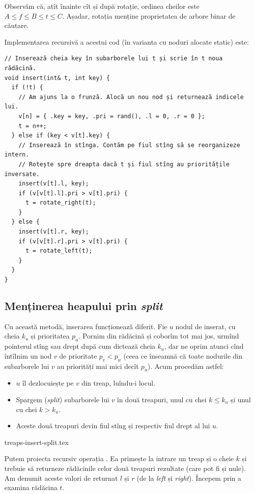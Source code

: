 \documentclass[../main.tex]{subfiles}
\begin{document}
Observăm că, atît înainte cît și după rotație, ordinea cheilor este $A \leq f \leq B \leq t \leq C$. Așadar, rotația menține proprietatea de arbore binar de căutare.

Implementarea recursivă a acestui cod (în varianta cu noduri alocate static) este:

\begin{verbatim}
// Inserează cheia key în subarborele lui t și scrie în t noua rădăcină.
void insert(int& t, int key) {
  if (!t) {
    // Am ajuns la o frunză. Alocă un nou nod și returnează indicele lui.
    v[n] = { .key = key, .pri = rand(), .l = 0, .r = 0 };
    t = n++;
  } else if (key < v[t].key) {
    // Inserează în stînga. Contăm pe fiul stîng să se reorganizeze intern.
    // Rotește spre dreapta dacă t și fiul stîng au prioritățile inversate.
    insert(v[t].l, key);
    if (v[v[t].l].pri > v[t].pri) {
      t = rotate_right(t);
    }
  } else {
    insert(v[t].r, key);
    if (v[v[t].r].pri > v[t].pri) {
      t = rotate_left(t);
    }
  }
}
\end{verbatim}


\subsection{Menținerea heapului prin \textit{split}}

Cu această metodă, inserarea funcționează diferit. Fie $u$ nodul de inserat, cu cheia $k_u$ și prioritatea $p_u$. Pornim din rădăcină și coborîm tot mai jos, urmînd pointerul stîng sau drept după cum dictează cheia $k_u$, dar ne oprim atunci cînd întîlnim un nod $v$ de prioritate $p_v < p_u$ (ceea ce înseamnă că toate nodurile din subarborele lui $v$ au priorități mai mici decît $p_u$). Acum procedăm astfel:

\begin{itemize}
  \item $u$ îl dezlocuiește pe $v$ din treap, luîndu-i locul.
  \item Spargem (\textit{split}) subarborele lui $v$ în două treapuri, unul cu chei $k \leq k_u$ și unul cu chei $k > k_u$.
  \item Aceste două treapuri devin fiul stîng și respectiv fiul drept al lui $u$.
\end{itemize}

{treaps-insert-split.tex}

Putem proiecta recursiv operația . Ea primește la intrare un treap și o cheie $k$ și trebuie să returneze rădăcinile celor două treapuri rezultate (care pot fi și nule). Am denumit aceste valori de returnat $l$ și $r$ (de la \textit{left} și \textit{right}). Începem prin a examina rădăcina $t$.
\end{document}
